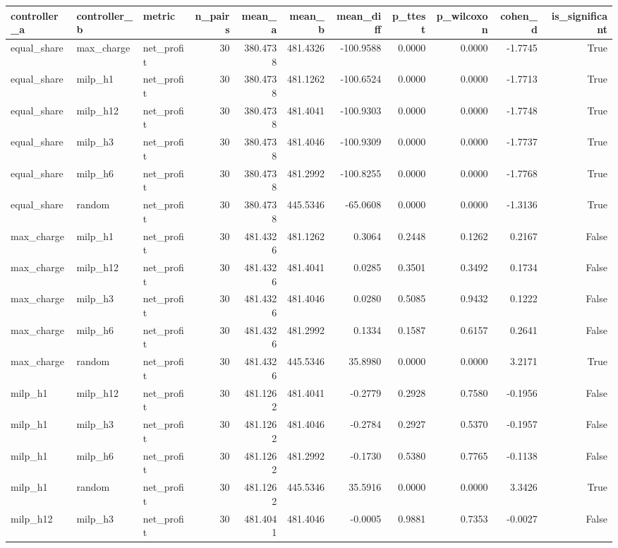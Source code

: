\begin{tabular}{lllrrrrrrrr}
\toprule
controller_a & controller_b & metric & n_pairs & mean_a & mean_b & mean_diff & p_ttest & p_wilcoxon & cohen_d & is_significant \\
\midrule
equal_share & max_charge & net_profit & 30 & 380.4738 & 481.4326 & -100.9588 & 0.0000 & 0.0000 & -1.7745 & True \\
equal_share & milp_h1 & net_profit & 30 & 380.4738 & 481.1262 & -100.6524 & 0.0000 & 0.0000 & -1.7713 & True \\
equal_share & milp_h12 & net_profit & 30 & 380.4738 & 481.4041 & -100.9303 & 0.0000 & 0.0000 & -1.7748 & True \\
equal_share & milp_h3 & net_profit & 30 & 380.4738 & 481.4046 & -100.9309 & 0.0000 & 0.0000 & -1.7737 & True \\
equal_share & milp_h6 & net_profit & 30 & 380.4738 & 481.2992 & -100.8255 & 0.0000 & 0.0000 & -1.7768 & True \\
equal_share & random & net_profit & 30 & 380.4738 & 445.5346 & -65.0608 & 0.0000 & 0.0000 & -1.3136 & True \\
max_charge & milp_h1 & net_profit & 30 & 481.4326 & 481.1262 & 0.3064 & 0.2448 & 0.1262 & 0.2167 & False \\
max_charge & milp_h12 & net_profit & 30 & 481.4326 & 481.4041 & 0.0285 & 0.3501 & 0.3492 & 0.1734 & False \\
max_charge & milp_h3 & net_profit & 30 & 481.4326 & 481.4046 & 0.0280 & 0.5085 & 0.9432 & 0.1222 & False \\
max_charge & milp_h6 & net_profit & 30 & 481.4326 & 481.2992 & 0.1334 & 0.1587 & 0.6157 & 0.2641 & False \\
max_charge & random & net_profit & 30 & 481.4326 & 445.5346 & 35.8980 & 0.0000 & 0.0000 & 3.2171 & True \\
milp_h1 & milp_h12 & net_profit & 30 & 481.1262 & 481.4041 & -0.2779 & 0.2928 & 0.7580 & -0.1956 & False \\
milp_h1 & milp_h3 & net_profit & 30 & 481.1262 & 481.4046 & -0.2784 & 0.2927 & 0.5370 & -0.1957 & False \\
milp_h1 & milp_h6 & net_profit & 30 & 481.1262 & 481.2992 & -0.1730 & 0.5380 & 0.7765 & -0.1138 & False \\
milp_h1 & random & net_profit & 30 & 481.1262 & 445.5346 & 35.5916 & 0.0000 & 0.0000 & 3.3426 & True \\
milp_h12 & milp_h3 & net_profit & 30 & 481.4041 & 481.4046 & -0.0005 & 0.9881 & 0.7353 & -0.0027 & False \\

\end{tabular}
